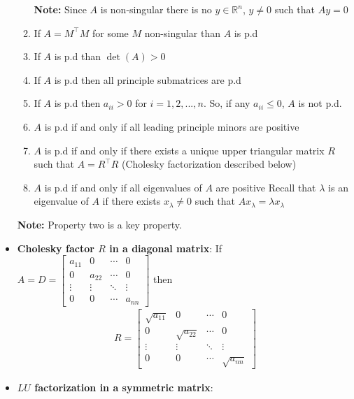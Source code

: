 \documentclass{report}
\begin{document}
\begin{itemize}
\begin{enumerate}
                    \bigbreak \noindent 
                    \textbf{Note:} Since $A$ is non-singular there is no $y \in \mathbb{R}^{n}$, $y\ne 0$ such that $Ay = 0$
                \item If $A = M^{\top}M$ for some $M$ non-singular than $A$ is p.d
                \item If $A$ is p.d than $\det(A) > 0$
                \item If $A$ is p.d then all principle submatrices are p.d
                \item If $A$ is p.d then $a_{ii}>0$ for $i=1,2,...,n$. So, if any $a_{ii} \leq 0$, $A$ is not p.d.
                \item $A$ is p.d if and only if all leading principle minors are positive
                \item $A$ is p.d if and only if there exists a unique upper triangular matrix $R$ such that $A = R^{\top}R$ (Cholesky factorization described below)
                \item $A$ is p.d if and only if all eigenvalues of $A$ are positive
                    \bigbreak \noindent 
                    Recall that $\lambda$ is an eigenvalue of $A$ if there exists $x_{\lambda} \ne 0$ such that $Ax_{\lambda}  = \lambda x_{\lambda}$
            \end{enumerate}
            \textbf{Note:} Property two is a key property.
        \item \textbf{Cholesky factor $R$ in a diagonal matrix}: If $A = D = \begin{bmatrix}
                a_{11} & 0 & \cdots & 0 \\
                0 & a_{22} & \cdots & 0 \\
                \vdots & \vdots & \ddots & \vdots \\
                0 & 0 & \cdots & a_{nn} 
        \end{bmatrix}$ then
        \begin{align*}
            R = \begin{bmatrix}
                \sqrt{a_{11}} & 0 & \cdots & 0 \\
                0 & \sqrt{a_{22}} & \cdots & 0 \\
                \vdots & \vdots & \ddots & \vdots \\
                0 & 0 & \cdots & \sqrt{a_{nn}}
            \end{bmatrix}
        \end{align*}
    \item \textbf{$LU$ factorization in a symmetric matrix}: 




    \end{itemize}
\end{document}

